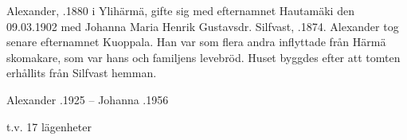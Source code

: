 Alexander, .1880 i Ylihärmä, gifte sig med efternamnet Hautamäki den 09.03.1902 med Johanna Maria Henrik Gustavsdr. Silfvast, .1874. Alexander tog senare efternamnet Kuoppala. Han var som flera andra inflyttade från Härmä skomakare, som var hans och familjens levebröd. Huset byggdes efter att tomten erhållits från Silfvast hemman.
\begin{jhchildren}
  \item {}
  \item {}
  \item {}
  \item {}
  \item {}
  \item {}
  \item {}
  \item {}
\end{jhchildren}

Alexander .1925  --  Johanna .1956

t.v. 17 lägenheter
